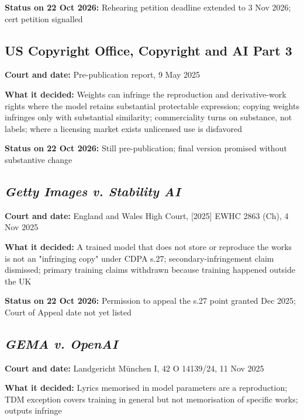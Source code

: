 \documentclass[10pt,a4paper]{article}
\begin{document}
\textbf{Status on 22 Oct 2026:} Rehearing petition deadline extended to
3 Nov 2026; cert petition signalled

\subsection{US Copyright Office, Copyright and AI Part
3}\label{us-copyright-office-copyright-and-ai-part-3}

\textbf{Court and date:} Pre-publication report, 9 May 2025

\textbf{What it decided:} Weights can infringe the reproduction and
derivative-work rights where the model retains substantial protectable
expression; copying weights infringes only with substantial similarity;
commerciality turns on substance, not labels; where a licensing market
exists unlicensed use is disfavored

\textbf{Status on 22 Oct 2026:} Still pre-publication; final version
promised without substantive change

\subsection{\texorpdfstring{\emph{Getty Images v. Stability
AI}}{Getty Images v. Stability AI}}\label{getty-images-v-stability-ai}

\textbf{Court and date:} England and Wales High Court, {[}2025{]} EWHC
2863 (Ch), 4 Nov 2025

\textbf{What it decided:} A trained model that does not store or
reproduce the works is not an "infringing copy" under CDPA s.27;
secondary-infringement claim dismissed; primary training claims
withdrawn because training happened outside the UK

\textbf{Status on 22 Oct 2026:} Permission to appeal the s.27 point
granted Dec 2025; Court of Appeal date not yet listed

\subsection{\texorpdfstring{\emph{GEMA v.
OpenAI}}{GEMA v. OpenAI}}\label{gema-v-openai}

\textbf{Court and date:} Landgericht München I, 42 O 14139/24, 11 Nov
2025

\textbf{What it decided:} Lyrics memorised in model parameters are a
reproduction; TDM exception covers training in general but not
memorisation of specific works; outputs infringe
\end{document}
